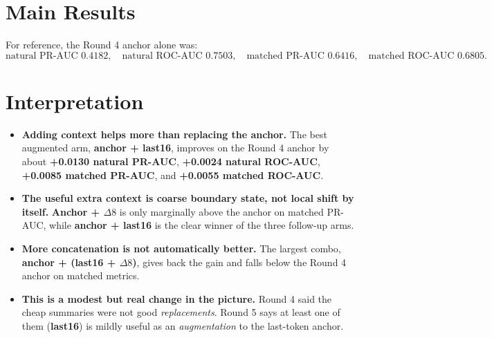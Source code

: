 \documentclass[11pt]{article}
\begin{document}
\section*{Main Results}
\begin{center}
\small
{}
\end{center}

For reference, the Round 4 anchor alone was:
\[
\text{natural PR-AUC } 0.4182, \quad
\text{natural ROC-AUC } 0.7503, \quad
\text{matched PR-AUC } 0.6416, \quad
\text{matched ROC-AUC } 0.6805.
\]

\section*{Interpretation}
\begin{itemize}
  \item \textbf{Adding context helps more than replacing the anchor.} The best augmented arm, \textbf{anchor + last16}, improves on the Round 4 anchor by about \textbf{+0.0130 natural PR-AUC}, \textbf{+0.0024 natural ROC-AUC}, \textbf{+0.0085 matched PR-AUC}, and \textbf{+0.0055 matched ROC-AUC}.
  \item \textbf{The useful extra context is coarse boundary state, not local shift by itself.} \textbf{Anchor + $\Delta8$} is only marginally above the anchor on matched PR-AUC, while \textbf{anchor + last16} is the clear winner of the three follow-up arms.
  \item \textbf{More concatenation is not automatically better.} The largest combo, \textbf{anchor + (last16 + $\Delta8$)}, gives back the gain and falls below the Round 4 anchor on matched metrics.
  \item \textbf{This is a modest but real change in the picture.} Round 4 said the cheap summaries were not good \emph{replacements}. Round 5 says at least one of them (\textbf{last16}) is mildly useful as an \emph{augmentation} to the last-token anchor.
\end{itemize}
\end{document}
